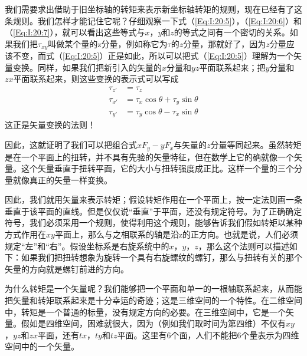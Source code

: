我们需要求出借助于旧坐标轴的转矩来表示新坐标轴转矩的规则，现在已经有了这条规则。我们怎样才能记住它呢？仔细观察一下式（\ref{Eq:I:20:5}），（\ref{Eq:I:20:6}）和（\ref{Eq:I:20:7}），就可以看出这些等式与$x$，$y$和$z$的等式之间有一个密切的关系。如果我们把$\tau_{xy}$叫做某个量的z分量，例如称它为$\tau$的$z$分量，那就好了，因为$z$分量应该不变，而式（\ref{Eq:I:20:5}）正是如此，所以可以把式（\ref{Eq:I:20:5}）理解为一个矢量变换。同样，如果我们把新引入的矢量的$x$分量和$yz$平面联系起来；把$y$分量和$zx$平面联系起来，则这些变换的表示式可以写成
\begin{equation}
    \label{Eq:I:20:8}
    \begin{aligned}
        \tau_{z'} &= \tau_z \\
        \tau_{x'} &= \tau_x \cos \theta + \tau_y \sin \theta \\
        \tau_{y'} &= \tau_y \cos \theta - \tau_x \sin \theta 
    \end{aligned}
\end{equation}
这正是矢量变换的法则！

因此，这就证明了我们可以把组合式$xF_y-yF_x$与矢量的$z$分量等同起来。虽然转矩是在一个平面上的扭转，并不具有先验的矢量特征，但在数学上它的确就像一个矢量。这个矢量垂直于扭转平面，它的大小与扭转强度成正比。这样一个量的三个分量就像真正的矢量一样变换。

因此，我们就用矢量来表示转矩；假设转矩作用在一个平面上，按一定法则画一条垂直于该平面的直线。但是仅仅说“垂直”于平面，还没有规定符号。为了正确确定符号，我们必须采用一个规则，使得利用这个规则，能够告诉我们假如转矩以某种方式作用在$xy$平面上，那么与之相联系的轴是沿z的正方向。也就是说，人们必须规定“左”和“右”。假设坐标系是右旋系统中的$x$，$y$，$z$，那么这个法则可以描述如下：如果我们把扭转想象为旋转一个具有右旋螺纹的螺钉，那么与扭转有关的那个矢量的方向就是螺钉前进的方向。

为什么转矩是一个矢量呢？我们能够把一个平面和单一的一根轴联系起来，从而能把矢量和转矩联系起来是十分幸运的奇迹；这是三维空间的一个特性。在二维空间中，转矩是一个普通的标量，没有规定方向的必要。在三维空间中，它是一个矢量。假如是四维空间，困难就很大，因为（例如我们取时间为第四维）不仅有$xy$，$yz$和$zx$平面，还有$tx$，$ty$和$tz$平面。这里有6个面，人们不能把6个量表示为四维空间中的一个矢量。

